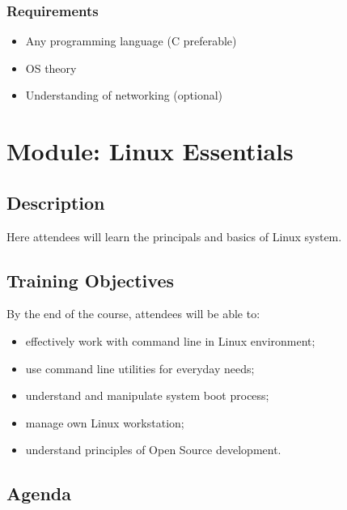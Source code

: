 \documentclass[12pt,a4paper,oneside]{article}
\begin{document}
\subsubsection{Requirements}
\begin{itemize}
	\item Any programming language (C preferable)
	\item OS theory
	\item Understanding of networking (optional)
\end{itemize}

\newpage

\section{Module: Linux Essentials}

\subsection{Description}

Here attendees will learn the principals and basics of Linux system.

\subsection{Training Objectives}

By the end of the course,  attendees will be able to:
\begin{itemize}
	\item effectively work with command line in Linux environment;
	\item use command line utilities for everyday needs;
	\item understand and manipulate system boot process;
	\item manage own Linux workstation;
	\item understand principles of Open Source development.
\end{itemize}

\subsection{Agenda}
\end{document}
